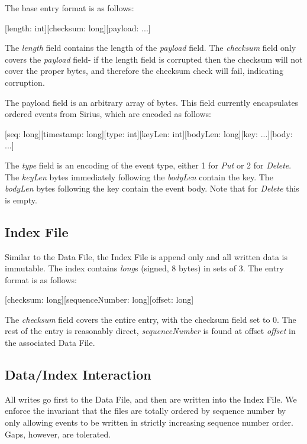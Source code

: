 \documentclass[11pt]{article}
\begin{document}
The base entry format is as follows:

\begin{center}
    [length: int][checksum: long][payload: ...]
\end{center}

The {\em length} field contains the length of the {\em payload} field. The
{\em checksum} field only covers the {\em payload} field- if the length
field is corrupted then the checksum will not cover the proper bytes, and therefore
the checksum check will fail, indicating corruption.

The payload field is an arbitrary array of bytes. This field currently encapsulates
ordered events from Sirius, which are encoded as follows:

\begin{center}
    [seq: long][timestamp: long][type: int][keyLen: int][bodyLen: long][key: ...][body: ...]
\end{center}

The {\em type} field is an encoding of the event type, either 1 for {\em Put} or 2 for
{\em Delete}.  The {\em keyLen} bytes immediately following the {\em bodyLen} contain the key.
The {\em bodyLen} bytes following the key contain the event body. Note that for {\em Delete}
this is empty.

\subsection{Index File}
Similar to the Data File, the Index File is append only and all written data is
immutable. The index contains {\em long}s (signed, 8 bytes) in sets of 3. The entry
format is as follows:

\begin{center}
    [checksum: long][sequenceNumber: long][offset: long]
\end{center}

The {\em checksum} field covers the entire entry, with the checksum field set to 0.
The rest of the entry is reasonably direct, {\em sequenceNumber} is found at offset
{\em offset} in the associated Data File.

\subsection{Data/Index Interaction}
All writes go first to the Data File, and then are written into the Index File.
We enforce the invariant that the files are totally ordered by sequence number
by only allowing events to be written in strictly increasing sequence number order.
Gaps, however, are tolerated.
\end{document}
